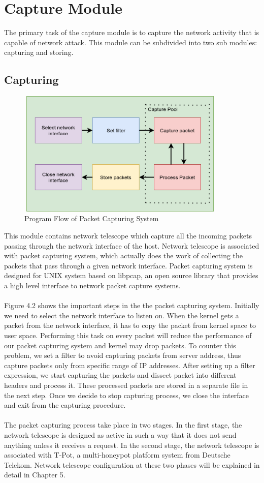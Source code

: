 \section{Capture Module}
The primary task of the capture module is to capture the network 
activity that is capable of network attack.
This module can be subdivided into two sub modules: capturing and storing.
\subsection{Capturing}
\begin{figure}[t]
    \centering
	\includegraphics[width=10cm, height=6cm]{images/packetcapture_flow1.png}
	\caption{ Program Flow of Packet Capturing System}
\end{figure}
This module contains network telescope which capture all the incoming packets passing through the network interface of the host.
Network telescope is associated with packet capturing system, which actually does the work of collecting the packets that pass through a given network interface.
Packet capturing system is designed for UNIX system based on libpcap, an open source library that provides a high level interface to network packet capture systems.\\\\
Figure 4.2 shows the important steps in the  the packet capturing system.
Initially we need to select the network interface to listen on.
When the kernel gets a packet from the network interface, it has to copy the packet from kernel space to user space. 
Performing this task on every packet will reduce the performance of our packet capturing system and kernel may drop packets.
To counter this problem, we set a filter to avoid capturing packets from server address, thus capture packets only from  specific range of IP addresses.
After setting up a filter expression, we start capturing the packets and  dissect packet into different headers and process it.
These processed packets are stored in a separate file in the next step.
Once we decide to stop capturing process, we close the interface and exit from the capturing procedure.\\\\
The packet capturing process take place in two stages. 
In the first stage, the network telescope is designed as active in such a way that it does not send anything unless it receives a request. 
In the second stage, the network telescope is associated with T-Pot, a multi-honeypot platform system from Deutsche Telekom.
Network telescope configuration at these two phases will be explained in detail in Chapter 5.
